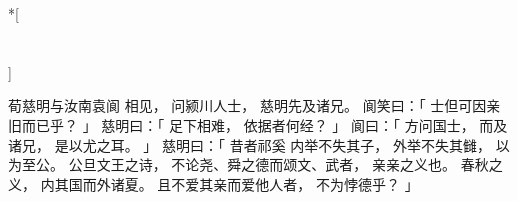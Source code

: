 
\switchcolumn[0]*[\section{}]

荀慈明与汝南袁阆
相见，
问颍川人士，
慈明先及诸兄。
阆笑曰：「
    士但可因亲旧而已乎？
」
慈明曰：「
    足下相难，
    依据者何经？
」
阆曰：「
    方问国士，
    而及诸兄，
    是以尤之耳。
」
慈明曰：「
    昔者祁奚
    内举不失其子，
    外举不失其雠，
    以为至公。
    公旦文王之诗，
    不论尧、舜之德而颂文、武者，
    亲亲之义也。
    春秋之义，
    内其国而外诸夏。
    且不爱其亲而爱他人者，
    不为悖德乎？
」

\switchcolumn



